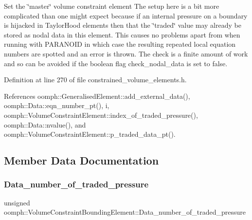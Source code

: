 Set the \char`\"{}master\char`\"{} volume constraint element The setup here is a bit more complicated than one might expect because if an internal pressure on a boundary is hijacked in Taylor\+Hood elements then that the \char`\"{}traded\char`\"{} value may already be stored as nodal data in this element. This causes no problems apart from when running with P\+A\+R\+A\+N\+O\+ID in which case the resulting repeated local equation numbers are spotted and an error is thrown. The check is a finite amount of work and so can be avoided if the boolean flag check\+\_\+nodal\+\_\+data is set to false. 



Definition at line 270 of file constrained\+\_\+volume\+\_\+elements.\+h.



References oomph\+::\+Generalised\+Element\+::add\+\_\+external\+\_\+data(), oomph\+::\+Data\+::eqn\+\_\+number\+\_\+pt(), i, oomph\+::\+Volume\+Constraint\+Element\+::index\+\_\+of\+\_\+traded\+\_\+pressure(), oomph\+::\+Data\+::nvalue(), and oomph\+::\+Volume\+Constraint\+Element\+::p\+\_\+traded\+\_\+data\+\_\+pt().



\subsection{Member Data Documentation}
\mbox{\label{classoomph_1_1VolumeConstraintBoundingElement_afd35462188f27b6851416ab49ec5df5a}} 
\subsubsection{\texorpdfstring{Data\+\_\+number\+\_\+of\+\_\+traded\+\_\+pressure}{Data\_number\_of\_traded\_pressure}}
{\footnotesize\ttfamily unsigned oomph\+::\+Volume\+Constraint\+Bounding\+Element\+::\+Data\+\_\+number\+\_\+of\+\_\+traded\+\_\+pressure\hspace{0.3cm}{\ttfamily [protected]}}



